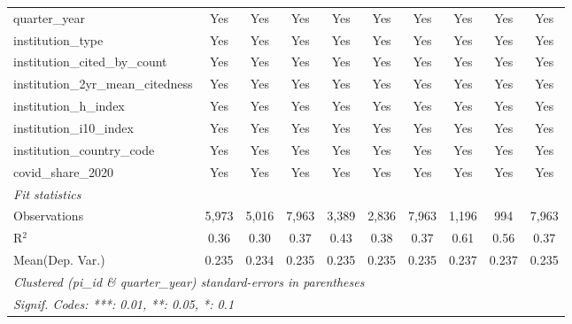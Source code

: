 \begin{tabular}{lccccccccc}
   quarter\_year                                               & Yes            & Yes            & Yes           & Yes           & Yes           & Yes           & Yes           & Yes     & Yes\\  
   institution\_type                                           & Yes            & Yes            & Yes           & Yes           & Yes           & Yes           & Yes           & Yes     & Yes\\  
   institution\_cited\_by\_count                               & Yes            & Yes            & Yes           & Yes           & Yes           & Yes           & Yes           & Yes     & Yes\\  
   institution\_2yr\_mean\_citedness                           & Yes            & Yes            & Yes           & Yes           & Yes           & Yes           & Yes           & Yes     & Yes\\  
   institution\_h\_index                                       & Yes            & Yes            & Yes           & Yes           & Yes           & Yes           & Yes           & Yes     & Yes\\  
   institution\_i10\_index                                     & Yes            & Yes            & Yes           & Yes           & Yes           & Yes           & Yes           & Yes     & Yes\\  
   institution\_country\_code                                  & Yes            & Yes            & Yes           & Yes           & Yes           & Yes           & Yes           & Yes     & Yes\\  
   covid\_share\_2020                                          & Yes            & Yes            & Yes           & Yes           & Yes           & Yes           & Yes           & Yes     & Yes\\  
   \midrule
   \emph{Fit statistics}\\
   Observations                                                & 5,973          & 5,016          & 7,963         & 3,389         & 2,836         & 7,963         & 1,196         & 994     & 7,963\\  
   R$^2$                                                       & 0.36           & 0.30           & 0.37          & 0.43          & 0.38          & 0.37          & 0.61          & 0.56    & 0.37\\  
Mean(Dep. Var.) & 0.235 & 0.234 & 0.235 & 0.235 & 0.235 & 0.235 & 0.237 & 0.237 & 0.235 \\
   \midrule \midrule
   \multicolumn{10}{l}{\emph{Clustered (pi\_id \& quarter\_year) standard-errors in parentheses}}\\
   \multicolumn{10}{l}{\emph{Signif. Codes: ***: 0.01, **: 0.05, *: 0.1}}\\
\end{tabular}
\par\endgroup
